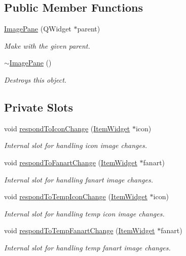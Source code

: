 \subsection*{Public Member Functions}
\begin{DoxyCompactItemize}
\item 
\hyperlink{class_u_i_1_1_image_pane_a6db6b50ddb928b11e5b3fa55d1207ddb}{Image\-Pane} (Q\-Widget $\ast$parent)
\begin{DoxyCompactList}\small\item\em Make with the given parent. \end{DoxyCompactList}\item 
\hypertarget{class_u_i_1_1_image_pane_afc7fbed886b297d99dc58a7c117f5184}{\hyperlink{class_u_i_1_1_image_pane_afc7fbed886b297d99dc58a7c117f5184}{$\sim$\-Image\-Pane} ()}\label{class_u_i_1_1_image_pane_afc7fbed886b297d99dc58a7c117f5184}

\begin{DoxyCompactList}\small\item\em Destroys this object. \end{DoxyCompactList}\end{DoxyCompactItemize}
\subsection*{Private Slots}
\begin{DoxyCompactItemize}
\item 
void \hyperlink{class_u_i_1_1_image_pane_ac479efb7416b73f07138c009ddf5111d}{respond\-To\-Icon\-Change} (\hyperlink{class_u_i_1_1_item_widget}{Item\-Widget} $\ast$icon)
\begin{DoxyCompactList}\small\item\em Internal slot for handling icon image changes. \end{DoxyCompactList}\item 
void \hyperlink{class_u_i_1_1_image_pane_ac571e70bddc2b65f77d8e24a72268e0c}{respond\-To\-Fanart\-Change} (\hyperlink{class_u_i_1_1_item_widget}{Item\-Widget} $\ast$fanart)
\begin{DoxyCompactList}\small\item\em Internal slot for handling fanart image changes. \end{DoxyCompactList}\item 
void \hyperlink{class_u_i_1_1_image_pane_a3193fe6b3e2928c959ce4554e750b56f}{respond\-To\-Temp\-Icon\-Change} (\hyperlink{class_u_i_1_1_item_widget}{Item\-Widget} $\ast$icon)
\begin{DoxyCompactList}\small\item\em Internal slot for handling temp icon image changes. \end{DoxyCompactList}\item 
void \hyperlink{class_u_i_1_1_image_pane_ae3a982f253a5a296d003217c87b52db7}{respond\-To\-Temp\-Fanart\-Change} (\hyperlink{class_u_i_1_1_item_widget}{Item\-Widget} $\ast$fanart)
\begin{DoxyCompactList}\small\item\em Internal slot for handling temp fanart image changes. \end{DoxyCompactList}\end{DoxyCompactItemize}
